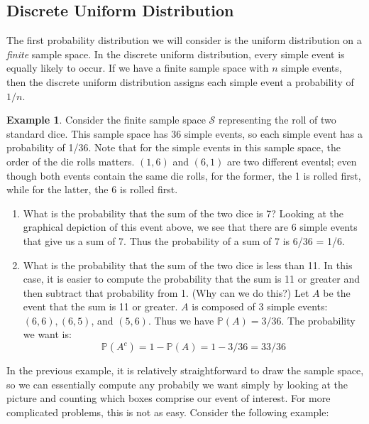 \documentclass[12pt]{article}
\theoremstyle{definition}
\newtheorem*{example}{Example}
\theoremstyle{remark}
\def\P{{\mathbb P}}
\def\cals{{\mathcal S}}
\begin{document}

\subsection{Discrete Uniform Distribution}
The first probability distribution we will consider is the uniform distribution on a \emph{finite} sample space. In the discrete uniform distribution, every simple event is equally likely to occur. If we have a finite sample space with $n$ simple events, then the discrete uniform distribution assigns each simple event a probability of $1/n$.

\begin{example}Consider the finite sample space $\cals$ representing the roll of two standard dice. This sample space has 36 simple events, so each simple event has a probability of 1/36. Note that for the simple events in this sample space, the order of the die rolls matters. $(1, 6)$ and $(6, 1)$ are two different eventsl; even though both events contain the same die rolls, for the former, the 1 is rolled first, while for the latter, the 6 is rolled first.
\begin{enumerate}
\item What is the probability that the sum of the two dice is 7? Looking at the graphical depiction of this event above, we see that there are 6 simple events that give us a sum of 7. Thus the probability of a sum of 7 is 6/36 = 1/6.
\item What is the probability that the sum of the two dice is less than 11. In this case, it is easier to compute the probability that the sum is 11 or greater and then subtract that probability from 1. (Why can we do this?) Let $A$ be the event that the sum is 11 or greater. $A$ is composed of 3 simple events: $(6, 6), (6, 5)$, and $(5, 6)$. Thus we have $\P(A) = 3/36$. The probability we want is:
\[
\P(A^c) = 1 - \P(A) = 1 - 3/36 = 33/36
\]
\end{enumerate}
\end{example}
In the previous example, it is relatively straightforward to draw the sample space, so we can essentially compute any probabily we want simply by looking at the picture and counting which boxes comprise our event of interest. For more complicated problems, this is not as easy. Consider the following example:
\end{document}
